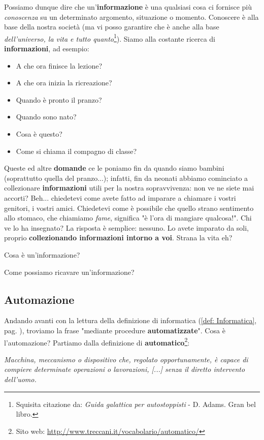\documentclass[11pt,fleqn,a5paper]{book} %
\begin{document}
				Possiamo dunque dire che un'\textbf{informazione} è una qualsiasi cosa ci fornisce più \textit{conoscenza} su un determinato argomento, situazione o momento. Conoscere è alla base della nostra società (ma vi posso garantire che è anche  alla base \textit{dell'universo, la vita e tutto quanto}\footnote{Squisita citazione da: \textit{Guida galattica per autostoppisti} - D. Adams. Gran bel libro.}). Siamo alla costante ricerca di \textbf{informazioni}, ad esempio:
    			\begin{itemize}
    				\item A che ora finisce la lezione?
    				\item A che ora inizia la ricreazione?
    				\item Quando è pronto il pranzo?
    				\item Quando sono nato?
    				\item Cosa è questo?
    				\item Come si chiama il compagno di classe?
    			\end{itemize}
    			Queste ed altre \textbf{domande} ce le poniamo fin da quando siamo bambini (soprattutto quella del pranzo...); infatti, fin da neonati abbiamo cominciato a collezionare \textbf{informazioni} utili per la nostra sopravvivenza: non ve ne siete mai accorti? Beh... chiedetevi come avete fatto ad imparare a chiamare i vostri genitori, i vostri amici. Chiedetevi come è possibile che quello strano sentimento allo stomaco, che chiamiamo \textit{fame}, significa "è l'ora di mangiare qualcosa!". Chi ve lo ha insegnato? La risposta è semplice: nessuno. Lo avete imparato da soli, proprio \textbf{collezionando informazioni intorno a voi}. Strana la vita eh?
    			\begin{exercise}
    				Cosa è un'informazione?
    			\end{exercise}    		
    			\begin{exercise}
    				Come possiamo ricavare un'informazione?
    			\end{exercise}
    			
    		\subsection{Automazione}
    		\label{sub: Automazione}
    			Andando avanti con la lettura della definizione di informatica (\ref{def: Informatica}, pag. \pageref{def: Informatica}), troviamo la frase "mediante procedure \textbf{automatizzate}". Cosa è l'automazione? Partiamo dalla definizione di \textbf{automatico}\footnote{Sito web: \url{http://www.treccani.it/vocabolario/automatico/}}:
    			\begin{definition}[Automatico]\label{def: Automatico}
    				\textit{Macchina, meccanismo o dispositivo che, regolato opportunamente, è capace di compiere determinate operazioni o lavorazioni, [...] senza il diretto intervento dell'uomo.}
    			\end{definition}
    		
\end{document}
